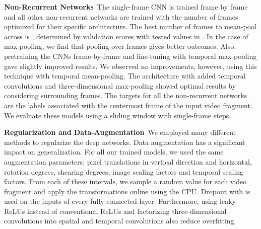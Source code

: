 \documentclass[11pt,a4paper]{article} \usepackage{a4wide}
\begin{document}
\textbf{Non-Recurrent Networks}\, The single-frame CNN is trained frame by frame and all other non-recurrent networks are trained with the number of frames optimized for their specific architecture. The best number of frames to mean-pool across is , determined by validation scores with tested values in . In the case of max-pooling, we find that pooling over  frames gives better outcomes. Also, pretraining the CNNs frame-by-frame and fine-tuning with temporal max-pooling gave slightly improved results. We observed no improvements, however, using this technique with temporal mean-pooling. The architecture with added temporal convolutions and three-dimensional max-pooling showed optimal results by considering  surrounding frames. The targets for all the non-recurrent networks are the labels associated with the centermost frame of the input video fragment. We evaluate these models using a sliding window with single-frame steps.


\textbf{Regularization and Data-Augmentation}\, We employed many different methods to regularize the deep networks. Data augmentation has a significant impact on generalization. For all our trained models, we used the same augmentation parameters:  pixel translations in vertical direction and  horizontal,  rotation degrees,  shearing degrees,  image scaling factors and  temporal scaling factors. From each of these intervals, we sample a random value for each video fragment and apply the transformations online using the CPU. Dropout with  is used on the inputs of every fully connected layer. Furthermore, using leaky ReLUs instead of conventional ReLUs and factorizing three-dimensional convolutions into spatial and temporal convolutions also reduce overfitting.
\end{document}
